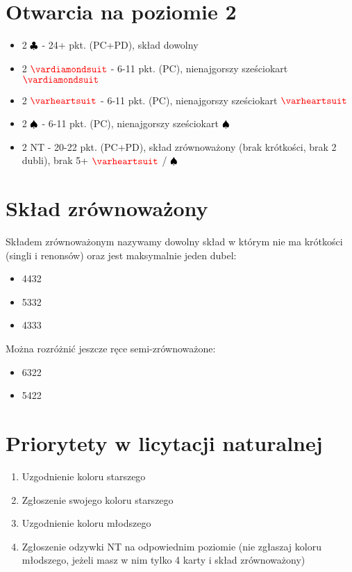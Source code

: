 \documentclass{article}
\newcommand*\Hs[1]{\ensuremath{\color{red}\varheartsuit}}
\newcommand*\Ss[1]{\ensuremath{\color{black}\spadesuit}}
\newcommand*\Ds[1]{\ensuremath{\color{red}\vardiamondsuit}}
\newcommand*\Cs[1]{\ensuremath{\color{black}\clubsuit}}
\newcommand*\NT[1]{{\color{black}\textsc{NT}}}
\begin{document}
    \section{Otwarcia na poziomie 2}
    	\begin{itemize}
    	\item 2 \Cs{} - 24+ pkt. (PC+PD), skład dowolny
    	\item 2 \Ds{} - 6-11 pkt. (PC), nienajgorszy sześciokart \Ds{}
    	\item 2 \Hs{} - 6-11 pkt. (PC), nienajgorszy sześciokart \Hs{}
    	\item 2 \Ss{} - 6-11 pkt. (PC), nienajgorszy sześciokart \Ss{}
    	\item 2 \NT{} - 20-22 pkt. (PC+PD), skład zrównoważony (brak krótkości, brak 2 dubli), brak 5+ \Hs{} / \Ss{}
    	\end{itemize}
    \section{Skład zrównoważony}
    	Składem zrównoważonym nazywamy dowolny skład w którym nie ma krótkości (singli i renonsów) oraz jest maksymalnie jeden dubel:
    	\begin{itemize}
    	\item 4432
    	\item 5332
    	\item 4333
    	\end{itemize}
    	Można rozróżnić jeszcze ręce semi-zrównoważone:
    	\begin{itemize}
    	\item 6322
    	\item 5422
    	\end{itemize}
    \section{Priorytety w licytacji naturalnej}
    \begin{enumerate}
    	\item Uzgodnienie koloru starszego
    	\item Zgłoszenie swojego koloru starszego
    	\item Uzgodnienie koloru młodszego
    	\item Zgłoszenie odzywki NT na odpowiednim poziomie (nie zgłaszaj koloru młodszego, jeżeli masz w nim tylko 4 karty i skład zrównoważony)
    \end{enumerate}
\end{document}
